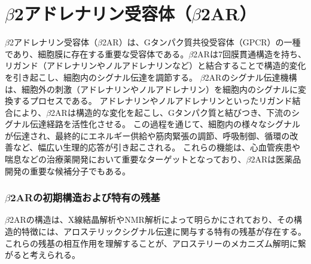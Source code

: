 \newpage

\section{$\beta$2アドレナリン受容体（$\beta$2AR）}\label{sec:b2ar}
$\beta$2アドレナリン受容体（$\beta$2AR）は、Gタンパク質共役受容体（GPCR）の一種であり、細胞膜に存在する重要な受容体である。$\beta$2ARは7回膜貫通構造を持ち、リガンド（アドレナリンやノルアドレナリンなど）と結合することで構造的変化を引き起こし、細胞内のシグナル伝達を調節する。
$\beta$2ARのシグナル伝達機構は、細胞外の刺激（アドレナリンやノルアドレナリン）を細胞内のシグナルに変換するプロセスである。
アドレナリンやノルアドレナリンといったリガンド結合により、$\beta$2ARは構造的な変化を起こし、Gタンパク質と結びつき、下流のシグナル伝達経路を活性化させる。
この過程を通じて、細胞内の様々なシグナルが伝達され、最終的にエネルギー供給や筋肉緊張の調節、呼吸制御、循環の改善など、幅広い生理的応答が引き起こされる。
これらの機能は、心血管疾患や喘息などの治療薬開発において重要なターゲットとなっており、$\beta$2ARは医薬品開発の重要な候補分子でもある。

\subsubsection*{$\beta$2ARの初期構造および特有の残基} 
$\beta$2ARの構造は、X線結晶解析やNMR解析によって明らかにされており、その構造的特徴には、アロステリックシグナル伝達に関与する特有の残基が存在する。
これらの残基の相互作用を理解することが、アロステリーのメカニズム解明に繋がると考えられる。
